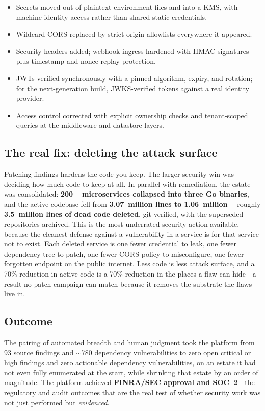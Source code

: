 \documentclass[11pt,letterpaper]{article}
\begin{document}
\begin{itemize}
  \item Secrets moved out of plaintext environment files and into a KMS, with
  machine-identity access rather than shared static credentials.
  \item Wildcard CORS replaced by strict origin allowlists everywhere it appeared.
  \item Security headers added; webhook ingress hardened with HMAC signatures plus
  timestamp and nonce replay protection.
  \item JWTs verified synchronously with a pinned algorithm, expiry, and rotation;
  for the next-generation build, JWKS-verified tokens against a real identity
  provider.
  \item Access control corrected with explicit ownership checks and tenant-scoped
  queries at the middleware and datastore layers.
\end{itemize}

\subsection{The real fix: deleting the attack surface}

Patching findings hardens the code you keep. The larger security win was deciding
how much code to keep at all. In parallel with remediation, the estate was
consolidated: \textbf{200+ microservices collapsed into three Go binaries}, and
the active codebase fell from \textbf{3.07~million lines to 1.06~million}
---roughly \textbf{3.5~million lines of dead code deleted}, git-verified, with the
superseded repositories archived. This is the most underrated security action
available, because the cleanest defense against a vulnerability in a service is
for that service not to exist. Each deleted service is one fewer credential to
leak, one fewer dependency tree to patch, one fewer CORS policy to misconfigure,
one fewer forgotten endpoint on the public internet. Less code is less attack
surface, and a 70\% reduction in active code is a 70\% reduction in the places a
flaw can hide---a result no patch campaign can match because it removes the
substrate the flaws live in.

\subsection{Outcome}

The pairing of automated breadth and human judgment took the platform from 93
source findings and $\sim$780 dependency vulnerabilities to zero open critical or
high findings and zero actionable dependency vulnerabilities, on an estate it had
not even fully enumerated at the start, while shrinking that estate by an order of
magnitude. The platform achieved \textbf{FINRA/SEC approval and SOC~2}---the
regulatory and audit outcomes that are the real test of whether security work was
not just performed but \emph{evidenced}.
\end{document}
